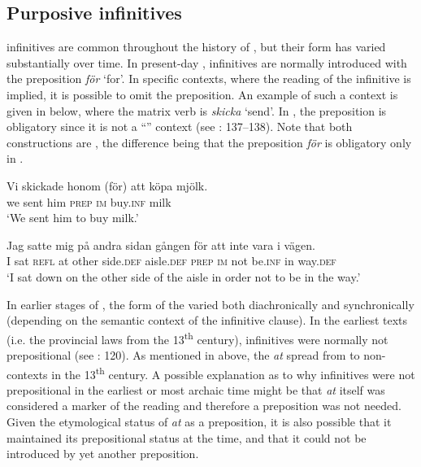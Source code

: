 \documentclass[output=paper]{langscibook}
\begin{document}
\subsection{Purposive infinitives}\label{sec:kalm:4.1}
 infinitives are common throughout the history of , but their form has varied substantially over time. In present-day ,  infinitives are normally introduced with the preposition \textit{för} ‘for’. In specific contexts, where the  reading of the infinitive is implied, it is possible to omit the preposition. An example of such a context is given in  below, where the matrix verb is \textit{skicka} ‘send’. In , the preposition is obligatory since it is not a “” context (see \citealt{Kalm2016Satsekvivalenta}: 137–138). Note that both constructions are , the difference being that the preposition \textit{för} is obligatory only in .


\ea {}\label{ex:kalm:8}
\ea \label{ex:kalm:8a}
\gll Vi skickade honom (för) att köpa mjölk.\\
we sent him \textsc{prep} \textsc{im} buy.\textsc{inf} milk\\
\glt ‘We sent him to buy milk.’

\ex  \label{ex:kalm:8b}
\gll Jag satte mig på andra sidan gången för att inte vara i vägen.\\
 I sat \textsc{refl} at other side.\textsc{def} aisle.\textsc{def} \textsc{prep} \textsc{im} not be.\textsc{inf} in way.\textsc{def}\\
\glt ‘I sat down on the other side of the aisle in order not to be in the way.’
\z 
\z 


In earlier stages of , the form of the  varied both diachronically and synchronically (depending on the semantic context of the infinitive clause). In the earliest  texts (i.e. the provincial laws from the 13\textsuperscript{th} century),  infinitives were normally not prepositional (see \citealt{Kalm2016Satsekvivalenta}: 120). As mentioned in  above, the  \textit{at} spread from  to non- contexts in the 13\textsuperscript{th} century. A possible explanation as to why  infinitives were not prepositional in the earliest or most archaic time might be that \textit{at} itself was considered a marker of the  reading and therefore a preposition was not needed. Given the etymological status of \textit{at} as a preposition, it is also possible that it maintained its prepositional status at the time, and that it could not be introduced by yet another preposition. 
\end{document}
